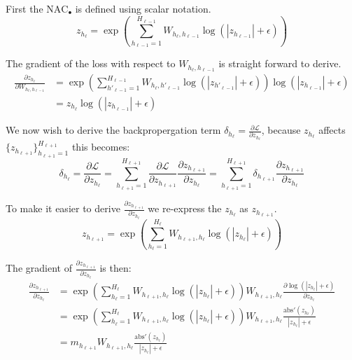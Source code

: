 First the $\textrm{NAC}_\bullet$ is defined using scalar notation.
\begin{equation}
z_{h_\ell} = \exp\left(\sum_{h_{\ell-1}=1}^{H_{\ell-1}} W_{h_{\ell}, h_{\ell-1}} \log(|z_{h_{\ell-1}}| + \epsilon) \right)
\end{equation}

The gradient of the loss with respect to $W_{h_\ell, h_{\ell-1}}$ is straight forward to derive.
\begin{equation}
\begin{aligned}
\frac{\partial z_{h_\ell}}{\partial W_{h_\ell, h_{\ell-1}}} &= \exp\left(\sum_{h'_{\ell-1}=1}^{H_{\ell-1}} W_{h_{\ell}, h'_{\ell-1}} \log(|z_{h'_{\ell-1}}| + \epsilon) \right) \log(|z_{h_{\ell-1}}| + \epsilon) \\
&= z_{h_\ell} \log(|z_{h_{\ell-1}}| + \epsilon)
\end{aligned}
\end{equation}

We now wish to derive the backpropergation term $\delta_{h_\ell} = \frac{\partial \mathcal{L}}{\partial z_{h_\ell}}$, because $z_{h_\ell}$ affects $\{z_{h_{\ell+1}}\}_{h_{\ell+1}=1}^{H_{\ell+1}}$ this becomes:
\begin{equation}
\delta_{h_\ell} = \frac{\partial \mathcal{L}}{\partial z_{h_\ell}} = \sum_{h_{\ell+1}=1}^{H_{\ell+1}} \frac{\partial \mathcal{L}}{\partial z_{h_{\ell+1}}} \frac{\partial z_{h_{\ell+1}}}{\partial z_{h_\ell}} = \sum_{h_{\ell+1}=1}^{H_{\ell+1}} \delta_{h_{\ell+1}} \frac{\partial z_{h_{\ell+1}}}{\partial z_{h_\ell}}
\end{equation}

To make it easier to derive $\frac{\partial z_{h_{\ell+1}}}{\partial z_{h_\ell}}$ we re-express the $z_{h_\ell}$ as $z_{h_{\ell+1}}$.
\begin{equation}
z_{h_{\ell+1}} = \exp\left(\sum_{h_{\ell}=1}^{H_{\ell}} W_{h_{\ell+1}, h_{\ell}} \log(|z_{h_{\ell}}| + \epsilon) \right)
\end{equation}

The gradient of $\frac{\partial z_{h_{\ell+1}}}{\partial z_{h_\ell}}$ is then:
\begin{equation}
\begin{aligned}
\frac{\partial z_{h_{\ell+1}}}{\partial z_{h_\ell}} &= \exp\left(\sum_{h_{\ell}=1}^{H_{\ell}} W_{h_{\ell+1}, h_{\ell}} \log(|z_{h_{\ell}}| + \epsilon) \right) W_{h_{\ell+1}, h_{\ell}} \frac{\partial \log(|z_{h_{\ell}}| + \epsilon)}{\partial z_{h_\ell}} \\
&= \exp\left(\sum_{h_{\ell}=1}^{H_{\ell}} W_{h_{\ell+1}, h_{\ell}} \log(|z_{h_{\ell}}| + \epsilon) \right) W_{h_{\ell+1}, h_{\ell}} \frac{\mathrm{abs}'(z_{h_{\ell}})}{|z_{h_{\ell}}| + \epsilon} \\
&= m_{h_{\ell+1}} W_{h_{\ell+1}, h_{\ell}} \frac{\mathrm{abs}'(z_{h_{\ell}})}{|z_{h_{\ell}}| + \epsilon} 
\end{aligned}
\end{equation}


